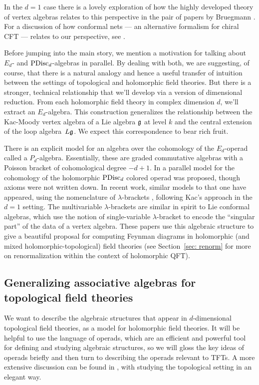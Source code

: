 \documentclass[11pt]{amsart}
\begin{document}
\begin{rmk}
In the $d=1$ case there is a lovely exploration of how the highly developed theory of vertex algebras relates to this perspective in the pair of papers by Bruegmann \cite{}.
For a discussion of how conformal nets --- an alternative formalism for chiral CFT --- relates to our perspective, see \cite{Henriques}.
\end{rmk}

Before jumping into the main story, we mention a motivation for talking about $E_d$- and ${\rm PDisc}_d$-algebras in parallel.
By dealing with both, we are suggesting, of course, that there is a natural analogy and hence a useful transfer of intuition between the settings of topological and holomorphic field theories.
But there is a stronger, technical relationship that we'll develop via a version of dimensional reduction.
From each holomorphic field theory in complex dimension $d$, 
we'll extract an $E_d$-algebra.
This construction generalizes the relationship between the Kac-Moody vertex algebra of a Lie algebra $\mathfrak g$ at level $k$ and the central extension of the loop algebra~$L\mathfrak g$.
We expect this correspondence to bear rich fruit.

There is an explicit model for an algebra over the cohomology of the $E_d$-operad called a $P_d$-algebra.
Essentially, these are graded commutative algebras with a Poisson bracket of cohomological degree $-d+1$.
In \cite{CostelloScheimbauer} a parallel model for the cohomology of the holomorphic ${\rm PDisc}_d$ colored operad was proposed, 
though axioms were not written down.
In recent work, similar models to that one have appeared,
using the nomenclature of $\lambda$-brackets \cite{BGKWY,GKW},
following Kac's approach in the $d=1$ setting. 
The multivariable $\lambda$-brackets are similar in spirit to Lie conformal algebras,
which use the notion of single-variable $\lambda$-bracket to encode the ``singular part'' of the data of a vertex algebra.
These papers use this algebraic structure to give a beautiful proposal for computing Feynman diagrams in holomorphic (and mixed holomorphic-topological) field theories (see Section~\ref{sec: renorm} for more on renormalization within the context of holomorphic QFT).


\subsection{Generalizing associative algebras for topological field theories}

We want to describe the algebraic structures that appear in $d$-dimensional topological field theories,
as a model for holomorphic field theories.
It will be helpful to use the language of operads, which are an efficient and powerful tool for defining and studying algebraic structures,
so we will gloss the key ideas of operads briefly and then turn to describing the operads relevant to TFTs.
A more extensive discussion can be found in \cite{CG1}, with \cite{ES} studying the topological setting in an elegant way.
\end{document}
